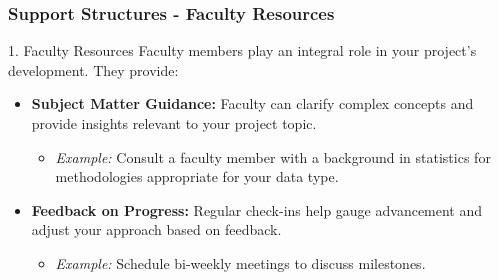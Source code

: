 \documentclass[aspectratio=169]{beamer}
\begin{document}
\begin{frame}[fragile]
    \frametitle{Support Structures - Faculty Resources}
    \begin{block}{1. Faculty Resources}
        Faculty members play an integral role in your project’s development. They provide:
        \begin{itemize}
            \item \textbf{Subject Matter Guidance:}
                Faculty can clarify complex concepts and provide insights relevant to your project topic.
                \begin{itemize}
                    \item \textit{Example:} Consult a faculty member with a background in statistics for methodologies appropriate for your data type.
                \end{itemize}
            \item \textbf{Feedback on Progress:}
                Regular check-ins help gauge advancement and adjust your approach based on feedback.
                \begin{itemize}
                    \item \textit{Example:} Schedule bi-weekly meetings to discuss milestones.
                \end{itemize}
        \end{itemize}
    \end{block}
\end{frame}
\end{document}
